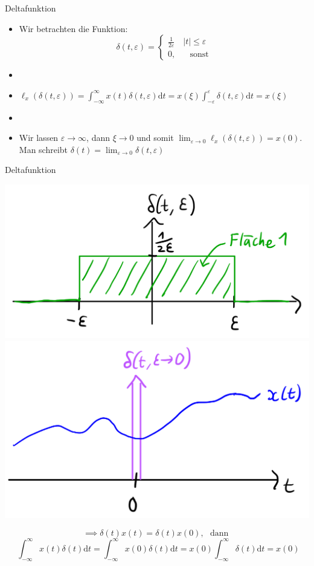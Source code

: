 \documentclass[14pt, aspectratio=169, handout]{beamer}
\begin{document}
\begin{frame}{Deltafunktion}
    \begin{itemize}
        \item Wir betrachten die Funktion:
        $$\delta(t, \varepsilon) = \begin{cases}
        \frac{1}{2\varepsilon} \hspace{12pt} |t|\leq \varepsilon\\
        0, \hspace{20pt} \text{sonst}
    \end{cases}$$
    \item[] 
    \item $\ell_x(\delta(t, \varepsilon)) = \displaystyle\int_{-\infty}^{\infty} x(t) \delta(t, \varepsilon)\text{d}t = x(\xi) \displaystyle\int_{-\varepsilon}^\varepsilon \delta(t, \varepsilon)\text{d}t = x(\xi)$
    \item[] 
    \item Wir lassen $\varepsilon \to \infty$, dann $\xi \to 0$ und somit $\displaystyle\lim_{\varepsilon \to 0} \ell_x(\delta(t, \varepsilon)) = x(0)$. Man schreibt $\delta(t) = \displaystyle\lim_{\varepsilon \to 0}\delta(t,\varepsilon)$
    \end{itemize}
\end{frame}

\begin{frame}{Deltafunktion}
    \begin{center}
        \includegraphics[width=0.4\linewidth]{figures/Deltafunktion_1.jpg}
        \includegraphics[width=0.4\linewidth]{figures/Deltafunktion_2.jpg}
    \end{center}
    $$\implies \delta(t)x(t) = \delta(t)x(0), \hspace{4pt} \text{ dann } $$
    $$\hspace{4pt} \int_{-\infty}^{\infty} x(t)\delta(t) \text{d}t = \int_{-\infty}^{\infty} x(0)\delta(t) \text{d}t = x(0)\int_{-\infty}^{\infty}\delta(t) \text{d}t = x(0)$$
\end{frame}
\end{document}
